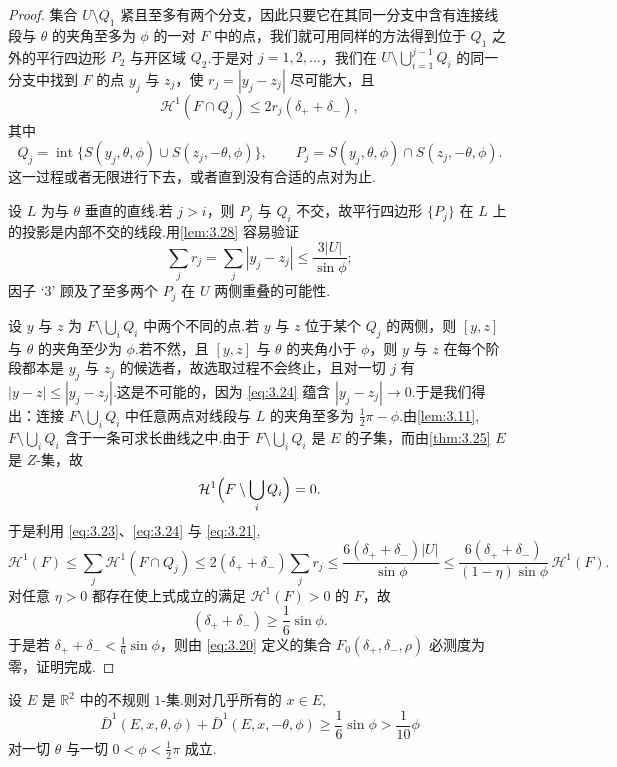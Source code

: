 \begin{proof}
集合 $U\setminus Q_1$ 紧且至多有两个分支，因此只要它在其同一分支中含有连接线段与 $\theta$ 的夹角至多为 $\phi$ 的一对 $F$ 中的点，我们就可用同样的方法得到位于 $Q_1$ 之外的平行四边形 $P_2$ 与开区域 $Q_2$.于是对 $j=1,2,\ldots$，我们在 $U\setminus\bigcup_{i=1}^{j-1}Q_i$ 的同一分支中找到 $F$ 的点 $y_j$ 与 $z_j$，使 $r_j=|y_j-z_j|$ 尽可能大，且
\begin{equation}\label{eq:3.23}
  \mathcal{H}^{1}(F\cap Q_j)\leq 2r_j(\delta_++\delta_-),
\end{equation}
其中
\[
  Q_j=\operatorname{int}\bigl\{S(y_j,\theta,\phi)\cup S(z_j,-\theta,\phi)\bigr\},
  \qquad
  P_j=S(y_j,\theta,\phi)\cap S(z_j,-\theta,\phi).
\]
这一过程或者无限进行下去，或者直到没有合适的点对为止.

设 $L$ 为与 $\theta$ 垂直的直线.若 $j>i$，则 $P_j$ 与 $Q_i$ 不交，故平行四边形 $\{P_j\}$ 在 $L$ 上的投影是内部不交的线段.用\cref{lem:3.28} 容易验证
\begin{equation}\label{eq:3.24}
  \sum_{j}r_j=\sum_{j}|y_j-z_j|\leq\frac{3|U|}{\sin\phi};
\end{equation}
因子 `3' 顾及了至多两个 $P_j$ 在 $U$ 两侧重叠的可能性.

设 $y$ 与 $z$ 为 $F\setminus\bigcup_{i}Q_i$ 中两个不同的点.若 $y$ 与 $z$ 位于某个 $Q_j$ 的两侧，则 $[y,z]$ 与 $\theta$ 的夹角至少为 $\phi$.若不然，且 $[y,z]$ 与 $\theta$ 的夹角小于 $\phi$，则 $y$ 与 $z$ 在每个阶段都本是 $y_j$ 与 $z_j$ 的候选者，故选取过程不会终止，且对一切 $j$ 有 $|y-z|\leq|y_j-z_j|$.这是不可能的，因为 \eqref{eq:3.24} 蕴含 $|y_j-z_j|\to 0$.于是我们得出：连接 $F\setminus\bigcup_{i}Q_i$ 中任意两点对线段与 $L$ 的夹角至多为 $\frac{1}{2}\pi-\phi$.由\cref{lem:3.11}, $F\setminus\bigcup_{i}Q_i$ 含于一条可求长曲线之中.由于 $F\setminus\bigcup_{i}Q_i$ 是 $E$ 的子集，而由\cref{thm:3.25} $E$ 是 $Z$-集，故
\[
  \mathcal{H}^{1}\Bigl(F\setminus\bigcup_{i}Q_i\Bigr)=0.
\]
于是利用 \eqref{eq:3.23}、\eqref{eq:3.24} 与 \eqref{eq:3.21},
\[
  \mathcal{H}^{1}(F)
  \leq\sum_{j}\mathcal{H}^{1}(F\cap Q_j)
  \leq 2(\delta_++\delta_-)\sum_{j}r_j
  \leq\frac{6(\delta_++\delta_-)|U|}{\sin\phi}
  \leq\frac{6(\delta_++\delta_-)}{(1-\eta)\sin\phi}\,\mathcal{H}^{1}(F).
\]
对任意 $\eta>0$ 都存在使上式成立的满足 $\mathcal{H}^1(F)>0$ 的 $F$，故
\[
  (\delta_++\delta_-)\geq\frac{1}{6}\sin\phi.
\]
于是若 $\delta_++\delta_-<\frac{1}{6}\sin\phi$，则由 \eqref{eq:3.20} 定义的集合 $F_0(\delta_+,\delta_-,\rho)$ 必测度为零，证明完成.
\end{proof}

\begin{corollary}\label{cor:3.30}
设 $E$ 是 $\mathbb{R}^2$ 中的不规则 $1$-集.则对几乎所有的 $x\in E$,
\begin{equation}\label{eq:3.25}
  \bar{D}^{1}(E,x,\theta,\phi)+\bar{D}^{1}(E,x,-\theta,\phi)\geq\frac{1}{6}\sin\phi>\frac{1}{10}\phi
\end{equation}
对一切 $\theta$ 与一切 $0<\phi<\frac{1}{2}\pi$ 成立.
\end{corollary}


